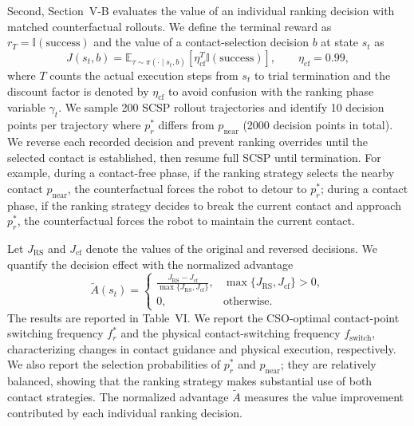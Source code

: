 \documentclass[journal,10pt]{IEEEtran}
\begin{document}
Second, Section~V-B evaluates the value of an individual ranking decision with matched counterfactual rollouts. We define the terminal reward as $r_T=\mathbb{I}(\mathrm{success})$ and the value of a contact-selection decision $b$ at state $s_t$ as
\begingroup
\begin{equation}
J(s_t,b)=\mathbb{E}_{\tau\sim\pi(\cdot\mid s_t,b)}\left[\eta_{\mathrm{cf}}^{T}\mathbb{I}(\mathrm{success})\right],
\qquad \eta_{\mathrm{cf}}=0.99,
\label{eq:ranking_value_reply}
\end{equation}
\endgroup
where $T$ counts the actual execution steps from $s_t$ to trial termination and the discount factor is denoted by $\eta_{\mathrm{cf}}$ to avoid confusion with the ranking phase variable $\gamma_t$.
We sample 200 SCSP rollout trajectories and identify 10 decision points per trajectory where $p_r^*$ differs from $p_{\mathrm{near}}$ (2000 decision points in total). We reverse each recorded decision and prevent ranking overrides until the selected contact is established, then resume full SCSP until termination. For example, during a contact-free phase, if the ranking strategy selects the nearby contact $p_{\mathrm{near}}$, the counterfactual forces the robot to detour to $p_r^*$; during a contact phase, if the ranking strategy decides to break the current contact and approach $p_r^*$, the counterfactual forces the robot to maintain the current contact.

Let $J_{\mathrm{RS}}$ and $J_{\mathrm{cf}}$ denote the values of the original and reversed decisions. We quantify the decision effect with the normalized advantage
\begingroup
\begin{equation}
\widetilde{A}(s_t)=
\begin{cases}
\displaystyle\frac{J_{\mathrm{RS}}-J_{\mathrm{cf}}}{\max\{J_{\mathrm{RS}},J_{\mathrm{cf}}\}},
& \max\{J_{\mathrm{RS}},J_{\mathrm{cf}}\}>0,\\[4pt]
0, & \text{otherwise}.
\end{cases}
\label{eq:ranking_advantage_reply}
\end{equation}
\endgroup
The results are reported in Table~VI. We report the CSO-optimal contact-point switching frequency $f_r^*$ and the physical contact-switching frequency $f_{\mathrm{switch}}$, characterizing changes in contact guidance and physical execution, respectively. We also report the selection probabilities of $p_r^*$ and $p_{\mathrm{near}}$; they are relatively balanced, showing that the ranking strategy makes substantial use of both contact strategies. The normalized advantage $\widetilde A$ measures the value improvement contributed by each individual ranking decision.
\end{document}
